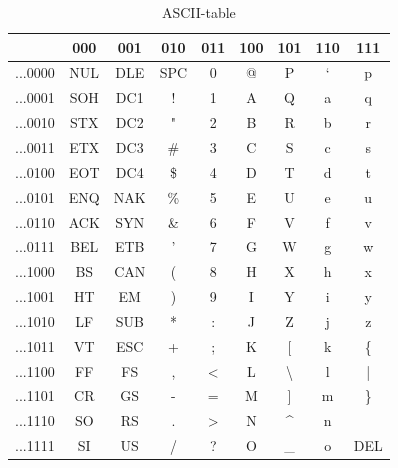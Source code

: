 \begin{table}[ht]
\caption{ASCII-table}
\label{asciitable}
\centering
	\begin{tabular}{ | c | c | c | c | c | c | c | c | c | }
\hline
\rowcolor{gray!60}
	& 000 & 001 & 010 & 011 & 100 & 101 & 110 & 111 \\
\hline
	...0000 & NUL & DLE & SPC & 0 & @ & P & ` & p \\
\hline
	...0001 & SOH & DC1 & ! & 1 & A & Q & a & q \\
\hline
	...0010 & STX & DC2 & " & 2 & B & R & b & r \\
\hline
	...0011 & ETX & DC3 & \# & 3 & C & S & c & s \\
\hline
	...0100 & EOT & DC4 & \$ & 4 & D & T & d & t \\
\hline
	...0101 & ENQ & NAK & \% & 5 & E & U & e & u \\
\hline
	...0110 & ACK & SYN & \& & 6 & F & V & f & v \\
\hline
	...0111 & BEL & ETB & ' & 7 & G & W & g & w \\
\hline
	...1000 & BS & CAN & ( & 8 & H & X & h & x \\
\hline
	...1001 & HT & EM & ) & 9 & I & Y & i & y \\
\hline
	...1010 & LF & SUB & * & : & J & Z & j & z \\
\hline
	...1011 & VT & ESC & + & ; & K & [ & k & \{ \\
\hline
	...1100 & FF & FS & , & < & L & \textbackslash & l & | \\
\hline
	...1101 & CR & GS & - & = & M & ] & m & \} \\
\hline
	...1110 & SO & RS & . & > & N & \textasciicircum & n & \texttildelow \\
\hline
	...1111 & SI & US & / & ? & O & \_ & o & DEL \\
\hline
\end{tabular}
\end{table}

